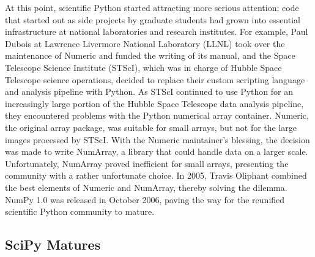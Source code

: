 \documentclass[fleqn,10pt]{wlscirep}
\begin{document}
At this point, scientific Python started attracting more serious attention;
code that started out as side projects by graduate students had grown into
essential infrastructure at national laboratories and research institutes.
For example, Paul Dubois at Lawrence Livermore National Laboratory (LLNL) took over the
maintenance of Numeric and funded the writing of its
manual\cite{Numeric-manual}, and
the Space Telescope Science Institute (STScI), which was in charge of
Hubble Space Telescope science operations, decided to replace their
custom scripting language and analysis pipeline with Python\cite{STScI-slither}.
As STScI continued to use Python for an increasingly large portion
of the Hubble Space Telescope data analysis pipeline, they encountered
problems with the Python numerical array container.
Numeric, the original array package, was
suitable for small arrays, but not for the large images processed by
STScI\@.  With the Numeric maintainer's blessing, the decision was made
to write NumArray\cite{greenfield2003numarray}, a library that could handle data on a larger
scale.  Unfortunately, NumArray proved inefficient for small arrays,
presenting the community with a rather unfortunate choice.  In 2005,
Travis Oliphant combined the best elements of Numeric and NumArray,
thereby solving the dilemma. NumPy 1.0 was released in October
2006\cite{numpy-1.0-tag}, paving the way for the reunified scientific
Python community to mature.

\subsection*{SciPy Matures}
\end{document}
